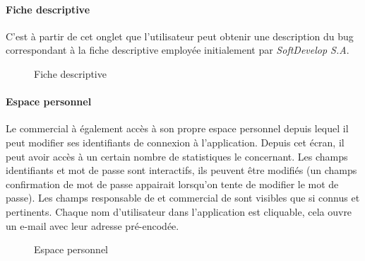 \documentclass{article}[12pt]
\begin{document}
 \paragraph{Fiche descriptive}
C'est à partir de cet onglet que l'utilisateur peut obtenir une description du bug correspondant à la fiche descriptive employée initialement par \textit{SoftDevelop S.A}.

\begin{figure}[H]
	\centering
	\caption{Fiche descriptive}
\end{figure}
 
 \paragraph{Espace personnel}
 Le commercial à également accès à son propre espace personnel depuis lequel il peut modifier ses identifiants de connexion à l'application. Depuis cet écran, il peut avoir accès à un certain nombre de statistiques le concernant. Les champs identifiants et mot de passe sont interactifs, ils peuvent être modifiés (un champs confirmation de mot de passe appairait lorsqu'on tente de modifier le mot de passe). Les champs \og responsable de \fg et \og commercial de \fg sont visibles que si connus et pertinents. Chaque nom d'utilisateur dans l'application est cliquable, cela ouvre un e-mail avec leur adresse pré-encodée.
\begin{figure}[H]
	\centering
	\caption{Espace personnel}
\end{figure}
\end{document}
